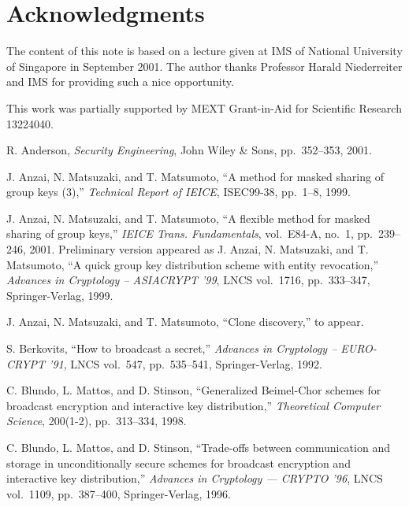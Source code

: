 \documentclass{ims9x6}
\begin{document}
\section*{Acknowledgments}
The content of this note is based on a lecture given at IMS of
National University of Singapore in September 2001. The author thanks
Professor Harald Niederreiter and IMS for providing such a nice
opportunity.

This work was partially supported by MEXT Grant-in-Aid for Scientific
Research 13224040.

\begin{thebibliography}{00}    %
 R. Anderson, {\em Security Engineering}, John Wiley
\& Sons, pp.~352--353, 2001.

 J. Anzai, N. Matsuzaki, and T. Matsumoto, ``A method
for masked sharing of group keys (3),'' {\em Technical Report of
IEICE}, ISEC99-38, pp.~1--8, 1999.

 J. Anzai, N. Matsuzaki, and T. Matsumoto, ``A
flexible method for masked sharing of group keys,'' {\em IEICE
Trans. Fundamentals}, vol.~E84-A, no.~1, pp.~239--246, 2001.
Preliminary version appeared as J. Anzai, N. Matsuzaki, and
T. Matsumoto, ``A quick group key distribution scheme with entity
revocation,'' {\em Advances in Cryptology -- ASIACRYPT '99}, LNCS
vol.~1716, pp.~333--347, Springer-Verlag, 1999.

 J. Anzai, N. Matsuzaki, and T. Matsumoto, ``Clone
discovery,'' to appear.

 S. Berkovits, ``How to broadcast a secret,'' {\em
Advances in Cryptology -- EURO-CRYPT '91}, LNCS vol.~547,
pp.~535--541, Springer-Verlag, 1992.

 C. Blundo, L. Mattos, and D. Stinson, ``Generalized
Beimel-Chor schemes for broadcast encryption and interactive key
distribution,'' {\em Theoretical Computer Science}, 200(1-2),
pp.~313--334, 1998.

 C. Blundo, L. Mattos, and D. Stinson, ``Trade-offs
between communication and storage in unconditionally secure schemes
for broadcast encryption and interactive key distribution,'' {\em
Advances in Cryptology --- CRYPTO '96}, LNCS vol.~1109, pp.~387--400,
Springer-Verlag, 1996.


\end{thebibliography}
\end{document}
